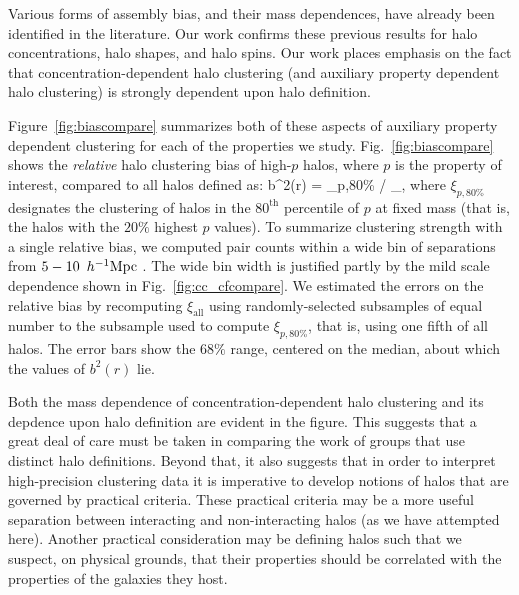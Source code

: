 \documentclass[usenatbib,fleqn]{mnras}
\begin{document}
Various forms of assembly bias, and their mass dependences, have already been identified in the literature. Our work confirms these previous results for halo concentrations, halo shapes, and halo spins.  Our work places emphasis on the fact that concentration-dependent halo clustering (and auxiliary property dependent halo clustering) is strongly dependent upon halo definition. 

Figure~\ref{fig:biascompare} summarizes both of these aspects of auxiliary property dependent clustering for each of the properties we study. Fig.~\ref{fig:biascompare} shows the {\em relative} halo clustering bias of high-$p$ halos, where $p$ is the property of interest, compared to all halos defined as: 
\beq
b^2(r) = \xi_{p,80\%} / \xi_{},
\eeq
%
where $\xi_{p,80\%}$ designates the clustering of halos in the $80^{\mathrm{th}}$ percentile of $p$ at fixed mass (that is, the halos with the $20\%$ highest $p$ values). To summarize clustering strength with a single relative bias, we computed pair counts within a wide bin of separations from $5-10\, \ h^{-1}\mathrm{Mpc}~$. The wide bin width is justified partly by the mild scale dependence shown in Fig.~\ref{fig:cc_cfcompare}. We estimated the errors on the relative bias by recomputing $\xi_{\mathrm{all}}$ using randomly-selected subsamples of equal number to the subsample used to compute $\xi_{p,80\%}$, that is, using one fifth of all halos. 
The error bars show the $68\%$ range, centered on the median, 
about which the values of $b^2(r)$ lie. 

Both the mass dependence of concentration-dependent halo clustering and its depdence upon halo definition are evident in the figure. This suggests that a great deal of care must be taken in comparing the work of groups that use distinct halo definitions. Beyond that, it also suggests that in order to interpret high-precision clustering data it is imperative to develop notions of halos that are governed by practical criteria. These practical criteria may be a more useful separation between interacting and non-interacting halos (as we have attempted here). Another practical consideration may be defining halos such that we suspect, on physical grounds, that their properties should be correlated with the properties of the galaxies they host. 
\end{document}
